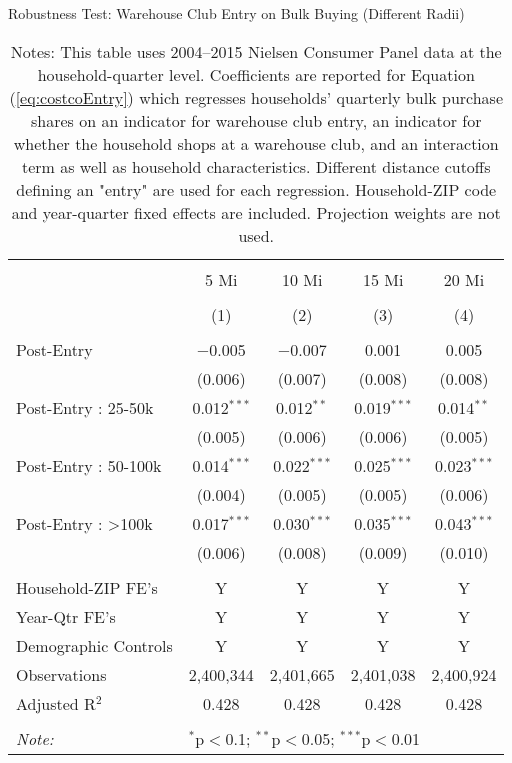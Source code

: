 \begin{table}[!htbp] \centering
  \caption{Robustness Test: Warehouse Club Entry on Bulk Buying (Different Radii)}
  \label{tab:appendixCostcoEntryDifferentRadii}
\begin{tabular}{@{\extracolsep{5pt}}lcccc}
\\[-1.8ex]\hline
\hline \\[-1.8ex]
 & 5 Mi & 10 Mi & 15 Mi & 20 Mi \\
\\[-1.8ex] & (1) & (2) & (3) & (4)\\
\hline \\[-1.8ex]
 Post-Entry & $-$0.005 & $-$0.007 & 0.001 & 0.005 \\
  & (0.006) & (0.007) & (0.008) & (0.008) \\
  Post-Entry : 25-50k & 0.012$^{***}$ & 0.012$^{**}$ & 0.019$^{***}$ & 0.014$^{**}$ \\
  & (0.005) & (0.006) & (0.006) & (0.005) \\
  Post-Entry : 50-100k & 0.014$^{***}$ & 0.022$^{***}$ & 0.025$^{***}$ & 0.023$^{***}$ \\
  & (0.004) & (0.005) & (0.005) & (0.006) \\
  Post-Entry : >100k & 0.017$^{***}$ & 0.030$^{***}$ & 0.035$^{***}$ & 0.043$^{***}$ \\
  & (0.006) & (0.008) & (0.009) & (0.010) \\
 \hline \\[-1.8ex]
Household-ZIP FE's & Y & Y & Y & Y \\
Year-Qtr FE's & Y & Y & Y & Y \\
Demographic Controls & Y & Y & Y & Y \\
Observations & 2,400,344 & 2,401,665 & 2,401,038 & 2,400,924 \\
Adjusted R$^{2}$ & 0.428 & 0.428 & 0.428 & 0.428 \\
\hline
\hline \\[-1.8ex]
\textit{Note:}  & \multicolumn{4}{l}{$^{*}$p$<$0.1; $^{**}$p$<$0.05; $^{***}$p$<$0.01} \\
\end{tabular}
\caption*{Notes: This table uses 2004--2015 Nielsen Consumer Panel data at the household-quarter level. Coefficients are reported for Equation (\ref{eq:costcoEntry}) which regresses households' quarterly bulk purchase shares on an indicator for warehouse club entry, an indicator for whether the household shops at a warehouse club, and an interaction term as well as household characteristics. Different distance cutoffs defining an "entry" are used for each regression. Household-ZIP code and year-quarter fixed effects are included. Projection weights are not used.}
\end{table}

